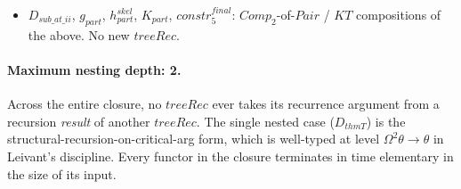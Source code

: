 \documentclass[11pt]{article}
\begin{document}
\begin{itemize}
        Leivant's allowed pattern: the critical args $\vec a$ in
        $g_{c_i}(\vec x)(\vec a)(\ldots)$ live at type $\Omega\theta$
        when the outer recurrence argument is at $\Omega\theta$, so
        re-invoking $f : \ldots, \Omega\theta \to \theta$ on them is
        well-typed.  Level: $\theta \times \Omega^2\theta \to \theta$
        when seen one level higher; safely $\Omega\theta \to \theta$
        when applied with the outer recurrence argument at
        $\Omega^2\theta$.
  \item $D_{\mathit{sub\_at\_ii}}$, $g_{\mathit{part}}$,
        $h_{\mathit{part}}^{\mathit{skel}}$, $K_{\mathit{part}}$,
        $\mathit{constr}_5^{\mathit{final}}$: $\mathit{Comp}_2$-of-$\mathit{Pair}$
        / $\mathit{KT}$ compositions of the above.  No new
        $\mathit{treeRec}$.
\end{itemize}

\paragraph{Maximum nesting depth: 2.}
Across the entire closure, no $\mathit{treeRec}$ ever takes its
recurrence argument from a recursion \emph{result} of another
$\mathit{treeRec}$.  The single nested case
($D_{\mathit{thmT}}$) is the structural-recursion-on-critical-arg form,
which is well-typed at level $\Omega^2\theta \to \theta$ in Leivant's
discipline.  Every functor in the closure terminates in time
elementary in the size of its input.
\end{document}
